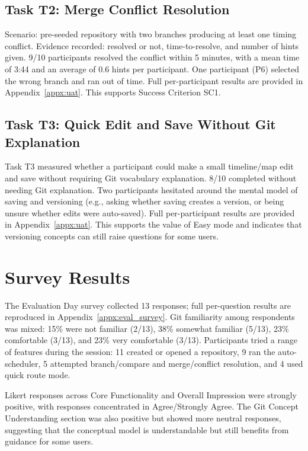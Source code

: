 \subsection{Task T2: Merge Conflict Resolution}
Scenario: pre-seeded repository with two branches producing at least one timing
conflict. Evidence recorded: resolved or not, time-to-resolve, and number of
hints given.
9/10 participants resolved the conflict within 5 minutes, with a mean time of
3:44 and an average of 0.6 hints per participant. One participant (P6) selected
the wrong branch and ran out of time. Full per-participant results are provided
in Appendix~\ref{appx:uat}. This supports Success Criterion SC1.

\subsection{Task T3: Quick Edit and Save Without Git Explanation}
Task T3 measured whether a participant could make a small timeline/map edit and
save without requiring Git vocabulary explanation.
8/10 completed without needing Git explanation. Two participants hesitated around
the mental model of saving and versioning (e.g., asking whether saving creates a
version, or being unsure whether edits were auto-saved). Full per-participant
results are provided in Appendix~\ref{appx:uat}. This supports the value of
Easy mode and indicates that versioning concepts can still raise questions for
some users.

\section{Survey Results}
The Evaluation Day survey collected 13 responses; full per-question results are
reproduced in Appendix~\ref{appx:eval_survey}. Git familiarity among
respondents was mixed: 15\% were not familiar (2/13), 38\% somewhat familiar
(5/13), 23\% comfortable (3/13), and 23\% very comfortable (3/13). Participants
tried a range of features during the session: 11 created or opened a repository,
9 ran the auto-scheduler, 5 attempted branch/compare and merge/conflict
resolution, and 4 used quick route mode.

Likert responses across Core Functionality and Overall Impression were strongly
positive, with responses concentrated in Agree/Strongly Agree. The Git Concept
Understanding section was also positive but showed more neutral responses,
suggesting that the conceptual model is understandable but still benefits from
guidance for some users.

